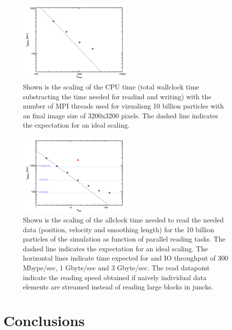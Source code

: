 \begin{figure}
\begin{center}
\includegraphics[width=0.5\textwidth]{t_cpu.pdf}
\end{center}
\caption{Shown is the scaling of the CPU time (total wallclock time substracting the time needed for 
readind and writing) with the number of MPI threads used for vizualisng 10 billion particles with an final
image size of 3200x3200 pixels. The dashed line indicates the expectation for an ideal scaling.}\label{cpu_scaling}
\end{figure}

\begin{figure}
\begin{center}
\includegraphics[width=0.5\textwidth]{t_read.pdf}
\end{center}
\caption{Shown is the scaling of the allclock time needed to read the needed data 
(position, velocity and smoothing length) for the 10 billion particles of the simulation
as function of parallel reading tasks. The dashed line indicates the expectation for an 
ideal scaling. The horizontal lines indicate time expected for and IO throughput of 300 Mbype/sec,
1 Gbyte/sec and 3 Gbyte/sec. The read datapoint indicate the reading speed obtained if naively 
individual data elements are streamed instead of reading large blocks in juncks.}\label{read_scaling}
\end{figure}


\section{Conclusions}
\label{conclusions}

